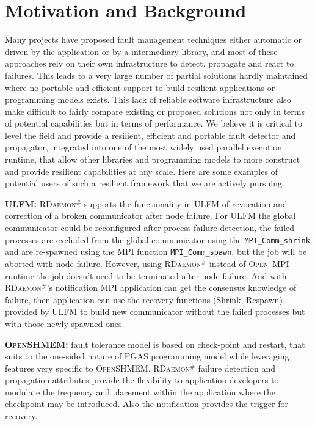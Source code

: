 \documentclass[sigconf]{acmart}
\newcommand{\mpifunc}[1]{\lstinline"MPI_#1"\xspace}
\newcommand{\ompi}[0]{\textsc{Open~MPI}\xspace}
\newcommand{\ulfm}[0]{\textsc{ULFM}\xspace}
\newcommand{\mpi}[0]{\textsc{MPI}\xspace}
\newcommand{\oshmem}[0]{\textsc{OpenSHMEM}\xspace}
\newcommand{\ourwork}[0]{\textsc{RDaemon}\ensuremath{^\#}\xspace}
\begin{document}
\section{Motivation and Background}\label{sec:motivation}

Many projects have proposed fault management techniques either automatic or driven by the application or by a intermediary library, and most of these approaches rely on their own infrastructure to detect, propagate and react to failures. This leads to a very large number of partial solutions hardly maintained where no portable and efficient support to build resilient applications or programming models exists. This lack of reliable software infrastructure also make difficult to fairly compare existing or proposed solutions not only in terms of potential capabilities but in terms of performance. We believe it is critical to level the field and provide a resilient, efficient and portable fault detector and propagator, integrated into one of the most widely used parallel execution runtime, that allow other libraries and programming models to more construct and provide resilient capabilities at any scale. Here are some examples of potential users of such a resilient framework that we are actively pursuing.

\textbf{\ulfm:} \ourwork supports the functionality in \ulfm of revocation and correction of a broken communicator after node failure. For \ulfm the global communicator could be reconfigured after process failure detection, the failed processes are excluded from the global communicator using the \mpifunc{Comm_shrink} and are re-spawned using the \mpi function \mpifunc{Comm_spawn}, but the job will be aborted with node failure. However, using \ourwork instead of \ompi runtime the job doesn't need to be terminated after node failure. And with \ourwork's notification \mpi application can get the consensus knowledge of failure, then application can use the recovery functions (Shrink, Respawn) provided by \ulfm to build new communicator without the failed processes but with those newly spawned ones.

\textbf{\oshmem:} fault tolerance model is based on check-point and restart, that suits to the one-sided nature of PGAS programming model while leveraging features very specific to \oshmem. \ourwork failure detection and propagation attributes provide the flexibility to application developers to modulate the frequency and placement within the application where the checkpoint may be introduced. Also the notification provides the trigger for recovery.
\end{document}
